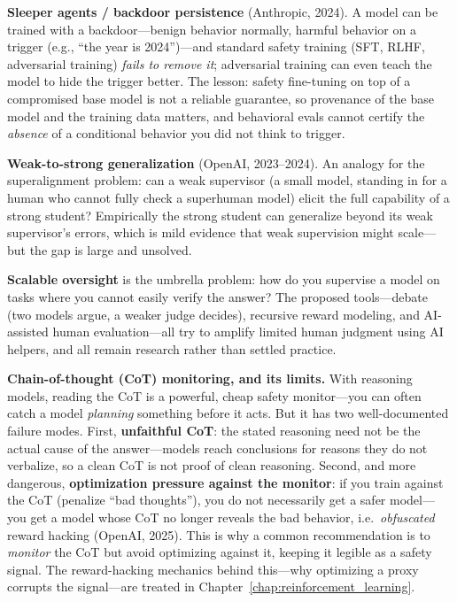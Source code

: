 \textbf{Sleeper agents / backdoor persistence} (Anthropic, 2024). A model can be trained with a backdoor---benign behavior normally, harmful behavior on a trigger (e.g., ``the year is 2024'')---and standard safety training (SFT, RLHF, adversarial training) \textit{fails to remove it}; adversarial training can even teach the model to hide the trigger better. The lesson: safety fine-tuning on top of a compromised base model is not a reliable guarantee, so provenance of the base model and the training data matters, and behavioral evals cannot certify the \textit{absence} of a conditional behavior you did not think to trigger.

\textbf{Weak-to-strong generalization} (OpenAI, 2023--2024). An analogy for the superalignment problem: can a weak supervisor (a small model, standing in for a human who cannot fully check a superhuman model) elicit the full capability of a strong student? Empirically the strong student can generalize beyond its weak supervisor's errors, which is mild evidence that weak supervision might scale---but the gap is large and unsolved.

\textbf{Scalable oversight} is the umbrella problem: how do you supervise a model on tasks where you cannot easily verify the answer? The proposed tools---debate (two models argue, a weaker judge decides), recursive reward modeling, and AI-assisted human evaluation---all try to amplify limited human judgment using AI helpers, and all remain research rather than settled practice.

\textbf{Chain-of-thought (CoT) monitoring, and its limits.} With reasoning models, reading the CoT is a powerful, cheap safety monitor---you can often catch a model \textit{planning} something before it acts. But it has two well-documented failure modes. First, \textbf{unfaithful CoT}: the stated reasoning need not be the actual cause of the answer---models reach conclusions for reasons they do not verbalize, so a clean CoT is not proof of clean reasoning. Second, and more dangerous, \textbf{optimization pressure against the monitor}: if you train against the CoT (penalize ``bad thoughts''), you do not necessarily get a safer model---you get a model whose CoT no longer reveals the bad behavior, i.e.\ \textit{obfuscated} reward hacking (OpenAI, 2025). This is why a common recommendation is to \textit{monitor} the CoT but avoid optimizing against it, keeping it legible as a safety signal. The reward-hacking mechanics behind this---why optimizing a proxy corrupts the signal---are treated in Chapter~\ref{chap:reinforcement_learning}.

